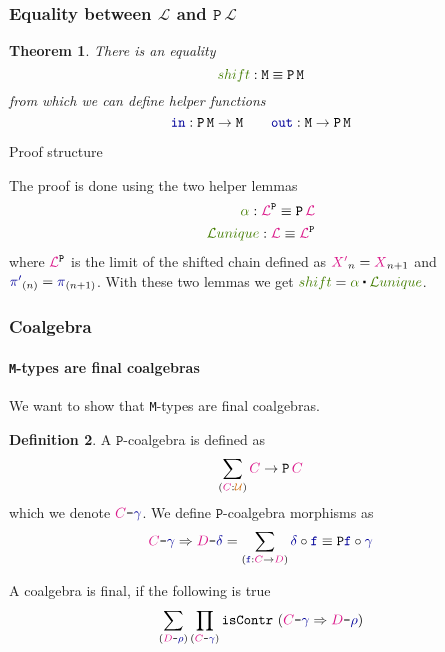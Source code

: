 \documentclass[xelatex,mathserif,serif,notheorems]{beamer} %
\theoremstyle{plain} %
\newtheorem{thm}{Theorem}[section]
\theoremstyle{definition}
\newtheorem{defn}[thm]{Definition}%
\theoremstyle{remark}
\newcommand*{\pathterm}[1]{\textcolor{green!65!red!75!black}{#1}}
\newcommand*{\type}[1]{\textcolor{magenta!90!black}{#1}}
\newcommand*{\universe}[1]{\textcolor{orange!80!black}{#1}}
\newcommand*{\coalg}[2]{#1\texttt{-}#2}
\newcommand*{\function}[1]{\textcolor{blue!60!black}{\ensuremath{\mathtt{#1}}}}
\newcommand*{\typeformer}[1]{\ensuremath{\mathtt{#1}}}
\newcommand*{\functor}[1]{\ensuremath{\mathbf{\mathtt{#1}}}}
\newcommand{\ct}{%
  \mathchoice{\mathbin{\raisebox{0.5ex}{$\displaystyle\centerdot$}}}%
  {\mathbin{\raisebox{0.5ex}{$\centerdot$}}}%
  {\mathbin{\raisebox{0.25ex}{$\scriptstyle\,\centerdot\,$}}}%
  {\mathbin{\raisebox{0.1ex}{$\scriptscriptstyle\,\centerdot\,$}}}
}
\newcommand{\setlengths}{
  \setlength{\abovedisplayskip}{4pt}
  \setlength{\belowdisplayskip}{4pt}
  \setlength{\abovedisplayshortskip}{2pt}
  \setlength{\belowdisplayshortskip}{2pt}
}
\begin{document}
\begin{frame}
  \frametitle{Equality between \(\mathcal{L}\) and \(\functor{P}\,\mathcal{L}\)}
  \begin{thm}\setlengths
    There is an equality
    \begin{equation}
      \pathterm{shift} : \typeformer{M} \equiv \functor{P}\,\typeformer{M}
    \end{equation}
    from which we can define helper functions
    \begin{equation}
      \function{in} : \functor{P}\,\typeformer{M} \rightarrow \typeformer{M} \qquad \function{out} : \typeformer{M} \rightarrow \functor{P}\,\typeformer{M}
    \end{equation}    
  \end{thm}
  \pause
  \begin{block}{Proof structure}\setlengths
    The proof is done using the two helper lemmas
    \begin{align}
      \pathterm{\alpha} : \type{\mathcal{L}}^{\functor{P}} \equiv \functor{P}\,\type{\mathcal{L}} \\
      \pathterm{\mathcal{L}unique} : \type{\mathcal{L}} \equiv \type{\mathcal{L}}^{\functor{P}}
    \end{align}
    where \(\type{\mathcal{L}}^{\functor{P}}\) is the limit of the shifted chain defined as \(\type{X'}_n = \type{X}_{n+1}\) and \(\function{\pi'}_{(n)} = \function{\pi}_{(n+1)}\). With these two lemmas we get \(\pathterm{shift} = \pathterm{\alpha} \ct \pathterm{\mathcal{L}unique}\).
  \end{block}
\end{frame}

\begin{frame}
  \frametitle{Coalgebra}
  \framesubtitle{\texttt{M}-types are final coalgebras}
  We want to show that \texttt{M}-types are final coalgebras.
  \begin{defn}\setlengths
    A \(\functor{P}\)-coalgebra is defined as
    \begin{equation}
      \sum_{(\type{C} : \universe{\mathcal{U}})} \type{C} \rightarrow \functor{P}\,\type{C}
    \end{equation}
    which we denote \(\coalg{\type{C}}{\function{\gamma}}\). We define \(\functor{P}\)-coalgebra morphisms as
    \begin{equation}
      \coalg{\type{C}}{\function{\gamma}} \Rightarrow \coalg{\type{D}}{\function{\delta}} = \sum_{(\function{f} : \type{C} \rightarrow \type{D})} \function{\delta} \circ \function{f} \equiv \functor{P} \function{f} \circ \function{\gamma}
    \end{equation}
  \end{defn}
  A coalgebra is final, if the following is true
  \begin{equation}
    \sum_{(\coalg{\type{D}}{\function{\rho}})}\prod_{(\coalg{\type{C}}{\function{\gamma}})} \mathtt{isContr}~(\coalg{\type{C}}{\function{\gamma}} \Rightarrow \coalg{\type{D}}{\function{\rho}})    
  \end{equation}
\end{frame}
\end{document}
